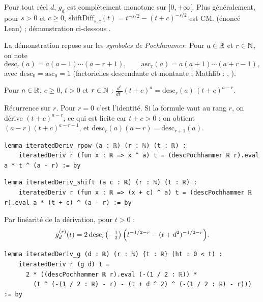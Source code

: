 \begin{theorem}\label{ch2:thm:dip}
Pour tout réel $d$, $g_d$ est complètement monotone sur $]0,+\infty[$. Plus généralement, pour $s>0$ et $c\ge0$,
$\mathrm{shiftDiff}_{s,c}(t)=t^{-s/2}-(t+c)^{-s/2}$ est CM. \tierA{} (énoncé Lean) ; démonstration ci-dessous \tierC.
\end{theorem}

La démonstration repose sur les \emph{symboles de Pochhammer}. Pour $a\in\mathbb{R}$ et $r\in\mathbb{N}$, on note
\[\mathrm{desc}_r(a)=a(a-1)\cdots(a-r+1),\qquad \mathrm{asc}_r(a)=a(a+1)\cdots(a+r-1),\]
avec $\mathrm{desc}_0=\mathrm{asc}_0=1$ (factorielles descendante et montante ; Mathlib : ,
).

\begin{lemma}\label{ch2:lem:pochder}
Pour $a\in\mathbb{R}$, $c\ge0$, $t>0$ et $r\in\mathbb{N}$ :
$\displaystyle\frac{d^r}{dt^r}(t+c)^a=\mathrm{desc}_r(a)\,(t+c)^{a-r}$.
\end{lemma}
\begin{humanproof}
Récurrence sur $r$. Pour $r=0$ c'est l'identité. Si la formule vaut au rang $r$, on dérive $(t+c)^{a-r}$, ce qui est
licite car $t+c>0$ : on obtient $(a-r)(t+c)^{a-r-1}$, et $\mathrm{desc}_r(a)(a-r)=\mathrm{desc}_{r+1}(a)$.
\end{humanproof}
\begin{leanbox}
\begin{lstlisting}[style=chdeux]
lemma iteratedDeriv_rpow (a : ℝ) (r : ℕ) (t : ℝ) :
    iteratedDeriv r (fun x : ℝ => x ^ a) t = (descPochhammer ℝ r).eval a * t ^ (a - r) := by
\end{lstlisting}
\begin{lstlisting}[style=chdeux]
lemma iteratedDeriv_shift (a c : ℝ) (r : ℕ) (t : ℝ) :
    iteratedDeriv r (fun x : ℝ => (x + c) ^ a) t = (descPochhammer ℝ r).eval a * (t + c) ^ (a - r) := by
\end{lstlisting}
\end{leanbox}

Par linéarité de la dérivation, pour $t>0$ :
\begin{equation}\label{ch2:eq:gder}
g_d^{(r)}(t)=2\,\mathrm{desc}_r\!\left(-\tfrac12\right)\Bigl(t^{-1/2-r}-(t+d^2)^{-1/2-r}\Bigr).
\end{equation}
\begin{leanbox}
\begin{lstlisting}[style=chdeux]
lemma iteratedDeriv_g (d : ℝ) (r : ℕ) {t : ℝ} (ht : 0 < t) :
    iteratedDeriv r (g d) t =
      2 * ((descPochhammer ℝ r).eval (-(1 / 2 : ℝ)) *
        (t ^ (-(1 / 2 : ℝ) - r) - (t + d ^ 2) ^ (-(1 / 2 : ℝ) - r))) := by
\end{lstlisting}
\end{leanbox}

